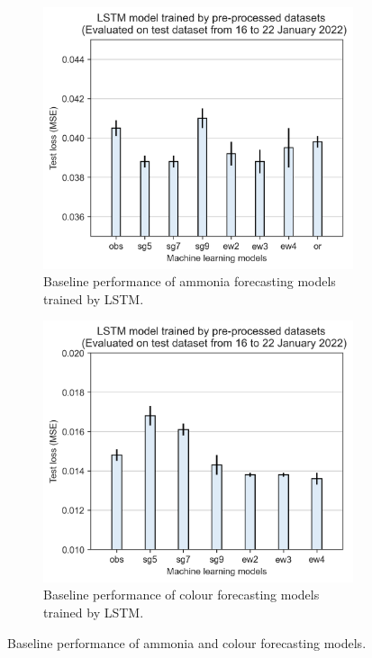 \begin{figure}[h]
  \centering
  \begin{subfigure}[t]{0.45\textwidth}
    \includegraphics[width=\linewidth]{imgs/results/feature-engineering/pre-processing-nh3-jan.png}
    \caption{Baseline performance of ammonia forecasting models trained by LSTM.} \label{fig:preprocessing-nh3}
  \end{subfigure}
  \hspace{2em}
  \begin{subfigure}[t]{0.45\textwidth}
    \includegraphics[width=\linewidth]{imgs/results/feature-engineering/pre-processing-colour.png}
    \caption{Baseline performance of colour forecasting models trained by LSTM.} \label{fig:preprocessing-colour}
  \end{subfigure}
\caption{Baseline performance of ammonia and colour forecasting models.} \label{fig:preprocessing-comparison}
\end{figure}
